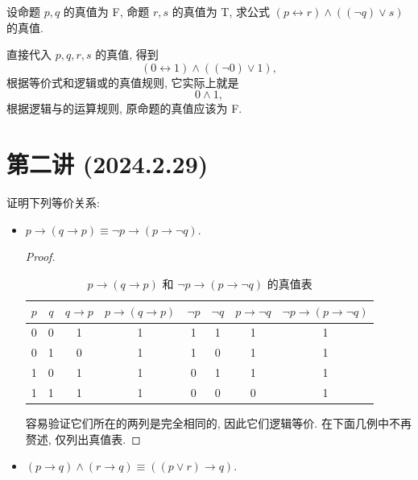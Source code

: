\documentclass[10pt,UTF8]{ctexbook} %
\begin{document}
\begin{exercise}
    设命题 $p,q$ 的真值为 F, 命题 $r,s$ 的真值为 T, 求公式 $(p \longleftrightarrow r)
    \wedge ((\lnot q) \vee s)$ 的真值.
    \begin{sol}
        直接代入 $p,q,r,s$ 的真值, 得到
        \[ (0 \leftrightarrow 1)\wedge((\lnot 0) \vee 1), \]
        根据等价式和逻辑或的真值规则, 它实际上就是
        \[ 0 \wedge 1, \]
        根据逻辑与的运算规则, 原命题的真值应该为 F.
    \end{sol}
\end{exercise}

\section{第二讲 (2024.2.29)}

\begin{exercise}
    证明下列等价关系:
    \begin{itemize}[itemsep=0pt]
        \item $p \to (q \to p) \equiv \lnot p \to (p \to \lnot q)$.
        \begin{proof}
            \begin{table}[H]
                \centering
                \caption{$p \to (q \to p)$ 和 $\lnot p \to (p \to \lnot q)$ 的真值表}
                \begin{tabular}{cccccccc}
                    \hline
                    $p$ & $q$ & $q \to p$ & $p \to (q \to p)$ & $\lnot p$ & $\lnot q$ & $p \to \lnot q$ & $\lnot p \to (p \to \lnot q)$ \\
                    \hline
                    0 & 0 & 1 & 1 & 1 & 1 & 1 & 1 \\
                    0 & 1 & 0 & 1 & 1 & 0 & 1 & 1 \\
                    1 & 0 & 1 & 1 & 0 & 1 & 1 & 1 \\
                    1 & 1 & 1 & 1 & 0 & 0 & 0 & 1 \\
                    \hline
                \end{tabular}
            \end{table}
            容易验证它们所在的两列是完全相同的, 因此它们逻辑等价.
            在下面几例中不再赘述, 仅列出真值表.
        \end{proof}
        \item $(p \to q)\wedge(r \to q) \equiv ((p \vee r) \to q)$.
        \begin{table}[H]
            \centering
            \begin{tabular}{cccccccc}

\end{tabular}
\end{table}
\end{itemize}
\end{exercise}
\end{document}

